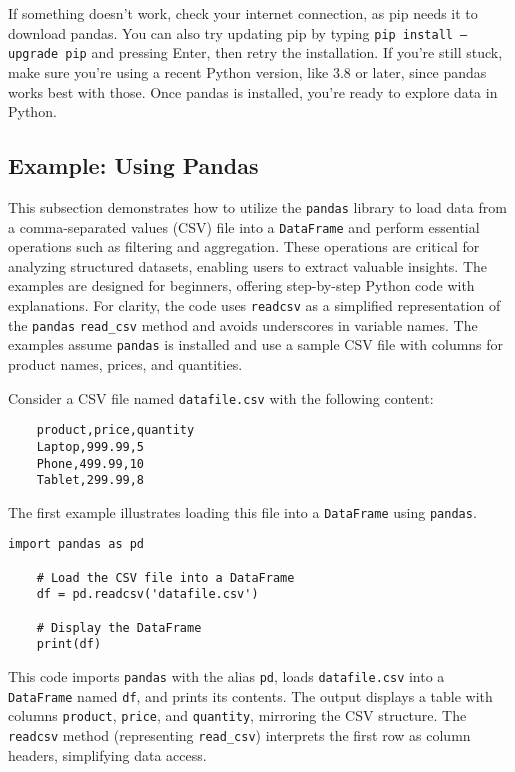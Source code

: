 If something doesn’t work, check your internet connection, as pip needs it to download pandas. You can also try updating pip by typing \texttt{pip install --upgrade pip} and pressing Enter, then retry the installation. If you’re still stuck, make sure you’re using a recent Python version, like 3.8 or later, since pandas works best with those. Once pandas is installed, you’re ready to explore data in Python.

\subsection{Example: Using Pandas}
This subsection demonstrates how to utilize the \texttt{pandas} library to load data from a comma-separated values (CSV) file into a \texttt{DataFrame} and perform essential operations such as filtering and aggregation. These operations are critical for analyzing structured datasets, enabling users to extract valuable insights. The examples are designed for beginners, offering step-by-step Python code with explanations. For clarity, the code uses \texttt{readcsv} as a simplified representation of the \texttt{pandas} \texttt{read\_csv} method and avoids underscores in variable names. The examples assume \texttt{pandas} is installed and use a sample CSV file with columns for product names, prices, and quantities.

Consider a CSV file named \texttt{datafile.csv} with the following content:
\begin{verbatim}
	product,price,quantity
	Laptop,999.99,5
	Phone,499.99,10
	Tablet,299.99,8
\end{verbatim}
The first example illustrates loading this file into a \texttt{DataFrame} using \texttt{pandas}.

\begin{lstlisting}[style=pythonstyle,caption={Loading a CSV file into a DataFrame},label={lst:pandas_load}]
	import pandas as pd
	
	# Load the CSV file into a DataFrame
	df = pd.readcsv('datafile.csv')
	
	# Display the DataFrame
	print(df)
\end{lstlisting}
This code imports \texttt{pandas} with the alias \texttt{pd}, loads \texttt{datafile.csv} into a \texttt{DataFrame} named \texttt{df}, and prints its contents. The output displays a table with columns \texttt{product}, \texttt{price}, and \texttt{quantity}, mirroring the CSV structure. The \texttt{readcsv} method (representing \texttt{read\_csv}) interprets the first row as column headers, simplifying data access.

